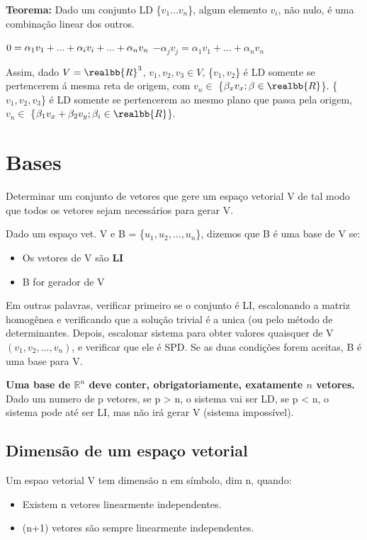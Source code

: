 \documentclass[letterpaper, 11pt]{article}
\begin{document}
\textbf{Teorema:} Dado um conjunto LD \{\(v_1...v_n\)\}, algum elemento \(v_i\), não nulo, é uma combinação linear dos outros.

\begin{center}$0 = \alpha_1v_1 + ... + \alpha_iv_i + ... + \alpha_nv_n \\$ 
$-\alpha_jv_j = \alpha_1v_1 + ... + \alpha_nv_n$ \end{center}

Assim, dado \(V = \realbb{R}^3\), \(v_1,v_2,v_3 \in V\), \{\(v_1,v_2\)\} é LD somente se pertencerem á mesma reta de origem, com \(v_n \in\) \{\(\beta_xv_x; \beta \in \realbb{R}\)\}. \{\(v_1,v_2,v_3\)\} é LD somente se pertencerem ao mesmo plano que passa pela origem, \(v_n \in\) \{\(\beta_1v_x + \beta_2v_y;\beta_i \in \realbb{R}\)\}.


\section{Bases}
\label{sec:org746b596}
Determinar um conjunto de vetores que gere um espaço vetorial V de tal modo que todos os vetores sejam necessários para gerar V.

Dado um espaço vet. V e B = \{\(u_1,u_2, ... ,u_n\)\}, dizemos que B é uma base de V se:
\begin{itemize}
\item Os vetores de V são \textbf{LI}
\item B for gerador de V
\end{itemize}

Em outras palavras, verificar primeiro se o conjunto é LI, escalonando a matriz homogênea e verificando que a solução trivial é a unica (ou pelo método de determinantes. Depois, escalonar 
sistema para obter valores quaisquer de V \((v_1, v_2, ... , v_n)\), e verificar que ele é SPD. Se as duas condições forem aceitas, B é uma base para V.

\textbf{Uma base de \(\mathbb{R}^n\) deve conter, obrigatoriamente, exatamente \(n\) vetores.} Dado um numero de p vetores, se p > n, o sistema vai ser LD, se p < n, o sistema pode até ser LI, mas não irá gerar V (sistema impossível).

\subsection{Dimensão de um espaço vetorial}
\label{sec:orgf000553}
Um espao vetorial V tem dimensão n em símbolo, dim n, quando:

\begin{itemize}
\item Existem n vetores linearmente independentes.
\item (n+1) vetores são sempre linearmente independentes.
\end{itemize}
\end{document}
